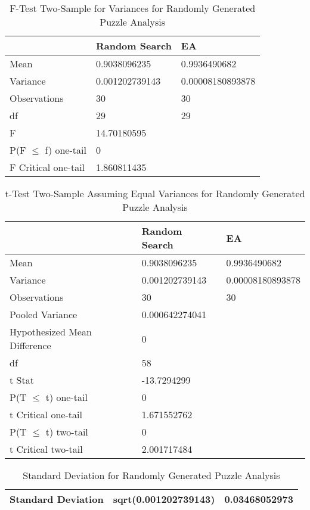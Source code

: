 \documentclass[11pt]{article}
\begin{document}
\begin{table}[H]
\centering
\caption{F-Test Two-Sample for Variances for Randomly Generated Puzzle Analysis}
\label{my-label}
\begin{tabular}{l|l|l}
 & Random Search & EA \\ \hline
Mean & 0.9038096235 & 0.9936490682 \\
Variance & 0.001202739143 & 0.00008180893878 \\
Observations & 30 & 30 \\
df & 29 & 29 \\
F & 14.70180595 &  \\
P(F $\leq$ f) one-tail & 0 &  \\
F Critical one-tail & 1.860811435 & 
\end{tabular}
\end{table}

\begin{table}[H]
\centering
\caption{t-Test Two-Sample Assuming Equal Variances for Randomly Generated Puzzle Analysis}
\label{my-label}
\begin{tabular}{l|l|l}
 & Random Search & EA \\ \hline
Mean & 0.9038096235 & 0.9936490682 \\
Variance & 0.001202739143 & 0.00008180893878 \\
Observations & 30 & 30 \\
Pooled Variance & 0.000642274041 &  \\
Hypothesized Mean Difference & 0 &  \\
df & 58 &  \\
t Stat & -13.7294299 &  \\
P(T $\leq$ t) one-tail & 0 &  \\
t Critical one-tail & 1.671552762 &  \\
P(T $\leq$ t) two-tail & 0 &  \\
t Critical two-tail & 2.001717484 &
\end{tabular}
\end{table}

\begin{table}[H]
\centering
\caption{Standard Deviation for Randomly Generated Puzzle Analysis}
\label{my-label}
\begin{tabular}{|l|l|l|}
\hline
Standard Deviation & sqrt(0.001202739143) & 0.03468052973 \\ \hline
\end{tabular}
\end{table}
\end{document}
